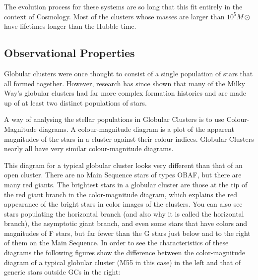 The evolution process for these systems are so long that this fit entirely in the context of Cosmology. Most of the clusters whose masses are larger than $10^{5}M\odot$ have lifetimes longer than the Hubble time.

\subsection{Observational Properties}

Globular clusters were once thought to consist of a single population of stars that all formed together. However, research has since shown that many of the Milky Way's globular clusters had far more complex formation histories and are made up of at least two distinct populations of stars.

A way of analysing the stellar populations in Globular Clusters is to use Colour-Magnitude diagrams. A colour-magnitude diagram is a plot of the apparent magnitudes of the stars in a cluster against their colour indices. Globular Clusters nearly all have very similar colour-magnitude diagrams.

This diagram for a typical globular cluster looks very different than that of an open cluster. There are no Main Sequence stars of types OBAF, but there are many red giants. The brightest stars in a globular cluster are those at the tip of the red giant branch in the color-magnitude diagram, which explains the red appearance of the bright stars in color images of the clusters. You can also see stars populating the horizontal branch (and also why it is called the horizontal branch), the asymptotic giant branch, and even some stars that have colors and magnitudes of F stars, but far fewer than the G stars just below and to the right of them on the Main Sequence. In order to see the characteristics of these diagrams the following figures show the difference between the color-magnitude diagram of a typical globular cluster (M55 in this case) in the left and that of generic stars outside GCs in the right:

